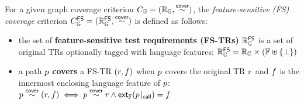 \begin{definition}\label{def:fs-cov}
  For a given graph coverage criterion $C_{\mathbb{G}} = (\mathbb{R}_{\mathbb{G}},
  \overset{\textsf{cover}}{\sim})$, the \textit{feature-sensitive (FS) coverage} criterion
  $C_{\mathbb{G}}^{\textsf{FS}} = (\mathbb{R}_{\mathbb{G}}^{\textsf{FS}}, \overset{\textsf{cover}}{\sim})$ is defined as follows:
  \begin{itemize}
    \item the set of \textbf{feature-sensitive test requirements (FS-TRs)}
      $\mathbb{R}_{\mathbb{G}}^{\textsf{FS}}$ is a set of original TRs optionally tagged with language
      features:
$
        \mathbb{R}_{\mathbb{G}}^{\textsf{FS}} = \mathbb{R}_{\mathbb{G}} \times (\mathbb{F} \uplus \{ \bot \})
$
    \item a path $p$ \textbf{covers} a FS-TR $(r, f)$ when $p$
      covers the original TR $r$ and $f$ is the innermost enclosing language feature
      of $p$:
$
        p \overset{\textsf{cover}}{\sim} (r, f) \iff p \overset{\textsf{cover}}{\sim} r \wedge
        \textsf{ext}_{\mathbb{F}}({p}\!\mid_{\textsf{call}}) = f
$
  \end{itemize}
\end{definition}


